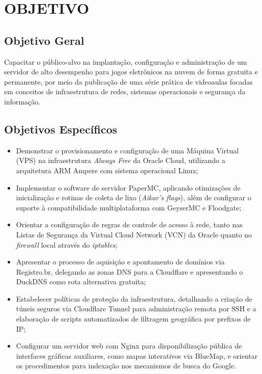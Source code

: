 

\chapter{OBJETIVO}
\label{capitulo-objetivo}
\section{Objetivo Geral}

Capacitar o público-alvo na implantação, configuração e administração de um servidor de alto desempenho para jogos eletrônicos na nuvem de forma gratuita e permanente, por meio da publicação de uma série prática de videoaulas focadas em conceitos de infraestrutura de redes, sistemas operacionais e segurança da informação.

\section{Objetivos Específicos}

\begin{itemize}
    \item Demonstrar o provisionamento e configuração de uma Máquina Virtual (VPS) na infraestrutura \textit{Always Free} da Oracle Cloud, utilizando a arquitetura ARM Ampere com sistema operacional Linux;
    \item Implementar o software de servidor PaperMC, aplicando otimizações de inicialização e rotinas de coleta de lixo (\textit{Aikar's flags}), além de configurar o suporte à compatibilidade multiplataforma com GeyserMC e Floodgate;
    \item Orientar a configuração de regras de controle de acesso à rede, tanto nas Listas de Segurança da Virtual Cloud Network (VCN) da Oracle quanto no \textit{firewall} local através do \textit{iptables};
    \item Apresentar o processo de aquisição e apontamento de domínios via Registro.br, delegando as zonas DNS para a Cloudflare e apresentando o DuckDNS como rota alternativa gratuita;
    \item Estabelecer políticas de proteção da infraestrutura, detalhando a criação de túneis seguros via Cloudflare Tunnel para administração remota por SSH e a elaboração de scripts automatizados de filtragem geográfica por prefixos de IP;
    \item Configurar um servidor web com Nginx para disponibilização pública de interfaces gráficas auxiliares, como mapas interativos via BlueMap, e orientar os procedimentos para indexação nos mecanismos de busca do Google.
\end{itemize}